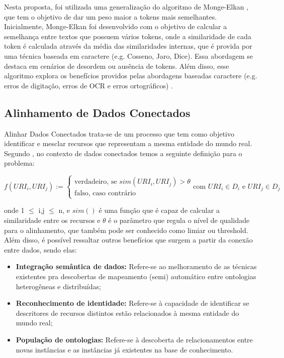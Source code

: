 Nesta proposta, foi utilizada uma generalização do algoritmo de Monge-Elkan \cite{monge1996field}, que tem o objetivo de dar um peso maior a tokens mais semelhantes. Inicialmente, Monge-Elkan foi desenvolvido com o objetivo de calcular a semelhança entre textos que possuem vários tokens, onde a similaridade de cada token é calculada através da média das similaridades internas, que é provida por uma técnica baseada em caractere (e.g. Cosseno, Jaro, Dice). Essa abordagem se destaca em cenários de desordem ou ausência de tokens. Além disso, esse algoritmo explora os benefícios providos pelas abordagens baseadas caractere (e.g. erros de digitação, erros de OCR e erros ortográficos) \cite{jimenez2009generalized}.

\subsection{Alinhamento de Dados Conectados}

Alinhar Dados Conectados  trata-se de um processo que tem como objetivo identificar e mesclar recursos que representam a mesma entidade do mundo real. Segundo , no contexto de dados conectados temos a seguinte definição para o problema:

\begin{equation}
f\left( { URI }_{ i },{ URI }_{ j } \right) :=\begin{cases} \mbox{verdadeiro, se } sim\left( { URI }_{ i },{ URI }_{ j } \right) >\theta  \\ \mbox{falso, caso contrário} \end{cases}\mbox{com }{ URI }_{ i } \in { D }_{ i }\mbox{ e }{ URI }_{ j } \in { D }_{ j }
\end{equation}

onde 1 $\leq$ i,j $\leq$ n, e $sim()$ é uma função que é capaz de calcular a similaridade entre os recursos e $\theta$ é o parâmetro que regula o nível de qualidade para o alinhamento, que também pode ser conhecido como limiar ou threshold. Além disso, é possível ressaltar outros benefícios que surgem a partir da conexão entre dados, sendo elas: 

\begin{itemize}
	\item \textbf{Integração semântica de dados:} Refere-se ao melhoramento de as técnicas existentes pra descobertas de mapeamento (semi) automático entre ontologias heterogêneas e distribuídas; 
	\item \textbf{Reconhecimento de identidade:} Refere-se à capacidade de identificar se descritores de recursos distintos estão relacionados à mesma entidade do mundo real; 
	\item\textbf{ População de ontologias:} Refere-se à descoberta de relacionamentos entre novas instâncias e as instâncias já existentes na base de conhecimento. 
\end{itemize}

